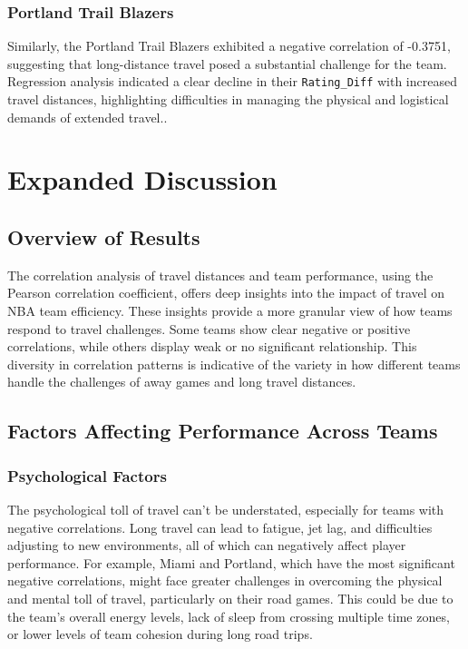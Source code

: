 \documentclass[12pt]{article}
\begin{document}
\subsubsection*{Portland Trail Blazers}
Similarly, the Portland Trail Blazers exhibited a negative correlation of -0.3751, suggesting that long-distance travel posed a substantial challenge for the team. Regression analysis indicated a clear decline in their \texttt{Rating\_Diff} with increased travel distances, highlighting difficulties in managing the physical and logistical demands of extended travel..

\section{Expanded Discussion}

\subsection{Overview of Results}
The correlation analysis of travel distances and team performance, using the Pearson correlation coefficient, offers deep insights into the impact of travel on NBA team efficiency. These insights provide a more granular view of how teams respond to travel challenges. Some teams show clear negative or positive correlations, while others display weak or no significant relationship. This diversity in correlation patterns is indicative of the variety in how different teams handle the challenges of away games and long travel distances.

\subsection{Factors Affecting Performance Across Teams}
\subsubsection{Psychological Factors}
The psychological toll of travel can’t be understated, especially for teams with negative correlations. Long travel can lead to fatigue, jet lag, and difficulties adjusting to new environments, all of which can negatively affect player performance. For example, Miami and Portland, which have the most significant negative correlations, might face greater challenges in overcoming the physical and mental toll of travel, particularly on their road games. This could be due to the team's overall energy levels, lack of sleep from crossing multiple time zones, or lower levels of team cohesion during long road trips.
\end{document}
